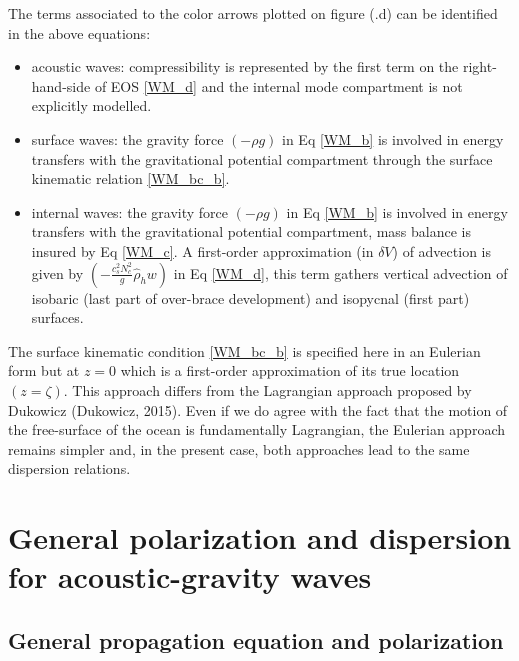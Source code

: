 \documentclass[a4paper,11pt]{article}
\begin{document}
The terms associated to the color arrows plotted on figure (.d) can be identified in the above equations:
\begin{itemize}
	\item acoustic waves: compressibility is represented by the first term on the right-hand-side of EOS \ref{WM_d} and the internal mode compartment is not explicitly modelled.
	\item surface waves: the gravity force $(-\rho g)$ in Eq \ref{WM_b} is involved in energy transfers with the gravitational potential compartment through the surface kinematic relation \ref{WM_bc_b}.
	\item internal waves: the gravity force $(-\rho g)$ in Eq \ref{WM_b} is involved in energy transfers with the gravitational potential compartment, mass balance is insured by Eq \ref{WM_c}. A first-order approximation (in $\delta V$) of advection is given by $(-\frac{c_s^2 N_c^2}{g} \hat{\rho}_h w)$ in Eq \ref{WM_d}, this term gathers vertical advection of isobaric (last part of over-brace development) and isopycnal (first part) surfaces.
\end{itemize}
The surface kinematic condition \ref{WM_bc_b} is specified here in an Eulerian form but at $z=0$ which is a first-order approximation of its true location $(z=\zeta)$. This approach differs from the Lagrangian approach proposed by Dukowicz (Dukowicz, 2015). Even if we do agree with the fact that the motion of the free-surface of the ocean is fundamentally Lagrangian, the Eulerian approach remains simpler and, in the present case, both approaches lead to the same dispersion relations.

\newpage
\section{General polarization and dispersion for acoustic-gravity waves}
\label{SectionDisp}
\subsection{General propagation equation and polarization}
\end{document}
